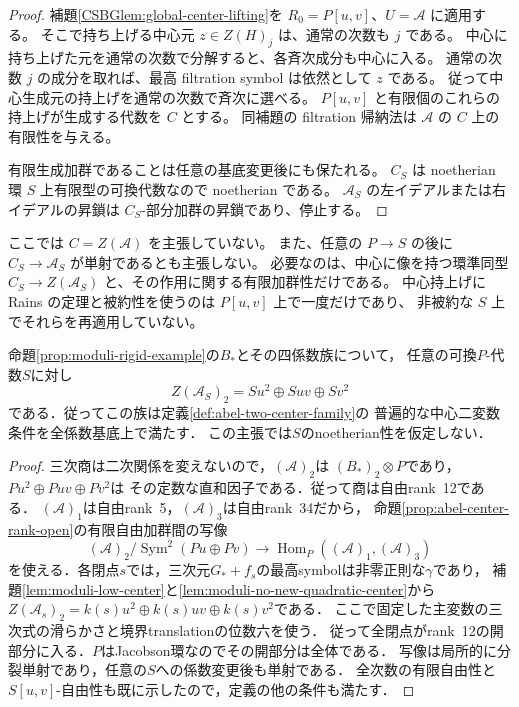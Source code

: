 \begin{proof}
補題\ref{CSBGlem:global-center-lifting}を $R_0=P[u,v]$、$U=\mathcal A$ に適用する。
そこで持ち上げる中心元 $z\in Z(H)_j$ は、通常の次数も $j$ である。
中心に持ち上げた元を通常の次数で分解すると、各斉次成分も中心に入る。
通常の次数 $j$ の成分を取れば、最高 filtration symbol は依然として $z$ である。
従って中心生成元の持上げを通常の次数で斉次に選べる。
$P[u,v]$ と有限個のこれらの持上げが生成する代数を $C$ とする。
同補題の filtration 帰納法は $\mathcal A$ の $C$ 上の有限性を与える。

有限生成加群であることは任意の基底変更後にも保たれる。
$C_S$ は noetherian 環 $S$ 上有限型の可換代数なので noetherian である。
$\mathcal A_S$ の左イデアルまたは右イデアルの昇鎖は $C_S$-部分加群の昇鎖であり、停止する。
\end{proof}

\begin{remark}[全中心および非被約基底の扱い]
\label{rem:central-model-not-full-center}
ここでは $C=Z(\mathcal A)$ を主張していない。
また、任意の $P\to S$ の後に $C_S\to\mathcal A_S$ が単射であるとも主張しない。
必要なのは、中心に像を持つ環準同型
$C_S\to Z(\mathcal A_S)$ と、その作用に関する有限加群性だけである。
中心持上げに Rains の定理と被約性を使うのは $P[u,v]$ 上で一度だけであり、
非被約な $S$ 上でそれらを再適用していない。
\end{remark}

\begin{corollary}[剛体族の普遍的な二次中心]
\label{cor:central-model-universal-center-two}
命題\ref{prop:moduli-rigid-example}の$B_*$とその四係数族について，
任意の可換$P$-代数$S$に対し
\[
 Z(\mathcal A_S)_2=S u^2\oplus S uv\oplus S v^2
\]
である．従ってこの族は定義\ref{def:abel-two-center-family}の
普遍的な中心二変数条件を全係数基底上で満たす．
この主張では$S$のnoetherian性を仮定しない．
\end{corollary}
\begin{proof}
三次商は二次関係を変えないので，$(\mathcal A)_2$は
$(B_*)_2\otimes P$であり，$Pu^2\oplus Puv\oplus Pv^2$は
その定数な直和因子である．従って商は自由rank~12である．
$(\mathcal A)_1$は自由rank~5，$(\mathcal A)_3$は自由rank~34だから，
命題\ref{prop:abel-center-rank-open}の有限自由加群間の写像
\[
 (\mathcal A)_2/\operatorname{Sym}^2(Pu\oplus Pv)
 \longrightarrow\operatorname{Hom}_P((\mathcal A)_1,(\mathcal A)_3)
\]
を使える．各閉点$s$では，三次元$G_*+f_s$の最高symbolは非零正則な$\gamma$であり，
補題\ref{lem:moduli-low-center}と\ref{lem:moduli-no-new-quadratic-center}から
$Z(\mathcal A_s)_2=k(s)u^2\oplus k(s)uv\oplus k(s)v^2$である．
ここで固定した主変数の三次式の滑らかさと境界translationの位数六を使う．
従って全閉点がrank~12の開部分に入る．$P$はJacobson環なのでその開部分は全体である．
写像は局所的に分裂単射であり，任意の$S$への係数変更後も単射である．
全次数の有限自由性と$S[u,v]$-自由性も既に示したので，定義の他の条件も満たす．
\end{proof}


